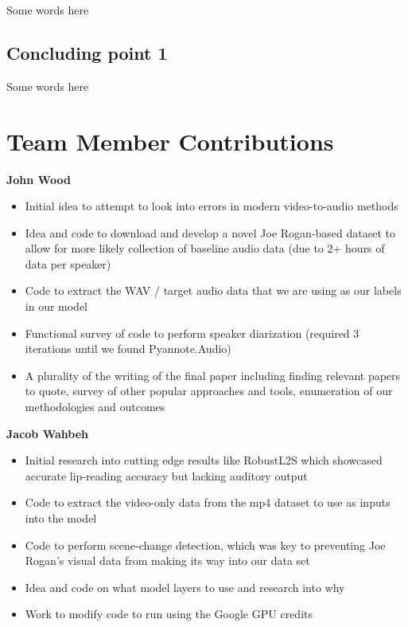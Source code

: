 \documentclass[10pt,twocolumn,letterpaper]{article}
\begin{document}
Some words here

\subsection{Concluding point 1}

Some words here


\section{Team Member Contributions}
\label{sec:conclusion}
\textbf{{John Wood}}
\begin{itemize}
    \item Initial idea to attempt to look into errors in modern video-to-audio methods
    \item Idea and code to download and develop a novel Joe Rogan-based dataset to allow for more likely collection of baseline audio data (due to 2+ hours of data per speaker)
    \item Code to extract the WAV / target audio data that we are using as our labels in our model
    \item Functional survey of code to perform speaker diarization (required 3 iterations until we found Pyannote.Audio)
    \item A plurality of the writing of the final paper including finding relevant papers to quote,  survey of other popular approaches and tools, enumeration of our methodologies and outcomes
\end{itemize}


\textbf{{Jacob Wahbeh}}
\begin{itemize}
    \item Initial research into cutting edge results like RobustL2S which showcased accurate lip-reading accuracy but lacking auditory output
    \item Code to extract the video-only data from the mp4 dataset to use as inputs into the model
    \item Code to perform scene-change detection, which was key to preventing Joe Rogan's visual data from making its way into our data set
    \item Idea and code on what model layers to use and research into why
    \item Work to modify code to run using the Google GPU credits
\end{itemize}
\end{document}
